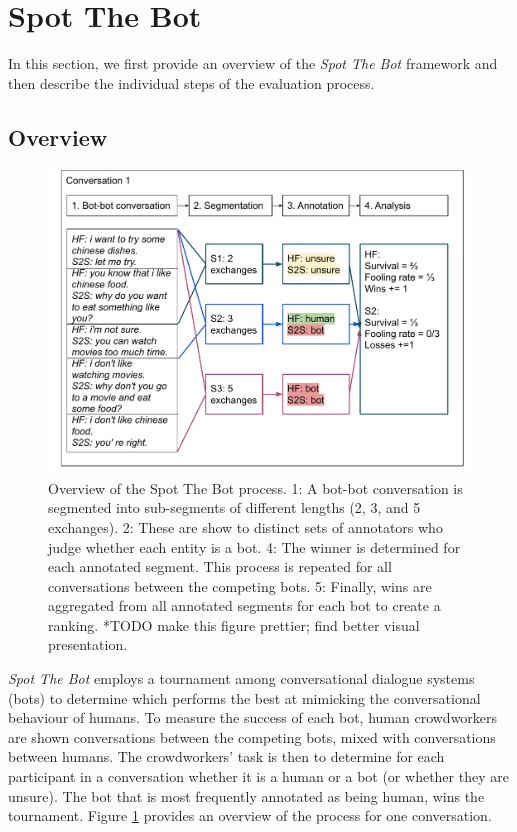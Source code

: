 \section{Spot The Bot}

In this section, we first provide an overview of the \emph{Spot The Bot} framework and then describe the individual steps of the evaluation process.

\subsection{Overview}
\begin{figure}
    \centering
    \includegraphics[width=0.7\linewidth]{figures/Spot the bot - annotation example - sketch3.pdf}
    \caption{Overview of the Spot The Bot process. 1: A bot-bot conversation is segmented into sub-segments of different lengths (2, 3, and 5 exchanges). 2: These are show to distinct sets of annotators who judge whether each entity is a bot. 4: The winner is determined for each annotated segment. This process is repeated for all conversations between the competing bots. 5: Finally, wins are aggregated from all annotated segments for each bot to create a ranking. *TODO make this figure prettier; find better visual presentation.}
    \label{fig:example}
\end{figure}
\emph{Spot The Bot} employs a tournament among conversational dialogue systems (bots) to determine which performs the best at mimicking the conversational behaviour of humans. To measure the success of each bot, human crowdworkers are shown conversations between the competing bots, mixed with conversations between humans. The crowdworkers' task is then to determine for each participant in a conversation whether it is a human or a bot (or whether they are unsure). The bot that is most frequently annotated as being human, wins the tournament. Figure \ref{fig:example} provides an overview of the process for one conversation.


